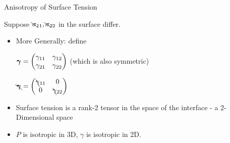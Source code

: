 \documentclass{article}
\begin{document}
\begin{section}{Anisotropy of Surface Tension}
    
  Suppose $\bcancel{\sigma}_{11}, \bcancel{\sigma}_{22}$ in the surface differ. 

   \begin{itemize} 
     \item More Generally: define

       $\bm{\gamma} = \begin{pmatrix}
     \gamma_{11} & \gamma_{12}\\
      \gamma_{21} & \gamma_{22}
     \end{pmatrix}$ (which is also symmetric)

   $\bcancel{\bm{\gamma}} = \begin{pmatrix}
   \bcancel{\gamma}_{11} & 0\\
   0 & \bcancel{\gamma}_{22}
   \end{pmatrix}$
 \item Surface tension is a rank-2 tensor in the space of the interface - a 2-Dimensional space
 \item $P$ is isotropic in 3D, $\gamma$ is isotropic in 2D.
   \end{itemize}

\end{section}
\end{document}
